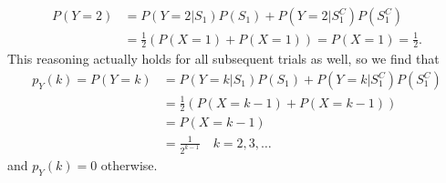 \begin{exercise}[BH.3.2]
\begin{solution}
\begin{enumerate}
		\begin{align*}
			P(Y=2) &= P(Y=2|S_{1})P(S_{1}) + P(Y=2|S_{1}^{C})P(S_{1}^{C})\\
			&=\frac{1}{2}(P(X=1) + P(X=1)) = P(X=1) = \frac{1}{2}.
		\end{align*}
		This reasoning actually holds for all subsequent trials as well, so we find that 
		\begin{align*}
			p_Y(k)=P(Y=k) &= P(Y=k|S_{1})P(S_{1}) + P(Y=k|S_{1}^C)P(S_{1}^C)\\
			& = \frac{1}{2}(P(X=k-1) + P(X=k-1))\\
			& = P(X=k-1)\\
			&= \frac{1}{2^{k-1}}\quad k = 2,3,\ldots		
		\end{align*}
		and $p_{Y}(k)=0$ otherwise.
	\end{enumerate}
\end{solution}
\end{exercise}


